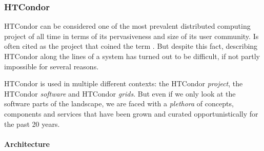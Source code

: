 \documentclass{sig-alternate}
\begin{document}



%
\subsubsection{HTCondor}

HTCondor can be considered one of the most prevalent distributed computing
project of all time in terms of its pervasiveness and size of its  user
community. Is often cited as the project that coined the term \pilotjob. But
despite this fact, describing HTCondor along the lines of a \pilotjob system has
turned out to be difficult, if not partly impossible for several reasons.

HTCondor is used in multiple different contexts: the HTCondor \textit{project},
the HTCondor \textit{software} and HTCondor \textit{grids}. But even if we only
look at the software parts of the landscape, we are faced with a
\textit{plethora} of concepts, components and services that have been grown and
curated opportunistically for the past 20 years.

\paragraph{Architecture}
\end{document}
